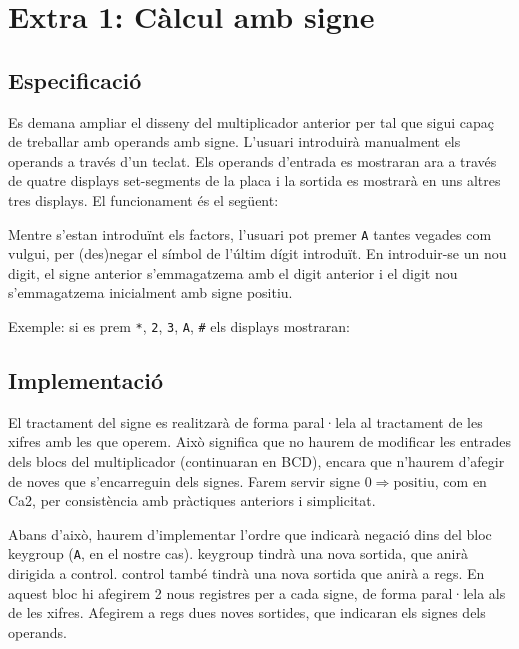 \chapter{Extra 1: Càlcul amb signe}

\section{Especificació}

Es demana ampliar el disseny del multiplicador anterior per tal que sigui capaç de treballar amb operands amb signe. L'usuari introduirà manualment els operands a través d'un teclat. Els operands d'entrada es mostraran ara a través de quatre displays set-segments de la placa i la sortida es mostrarà en uns altres tres displays. El funcionament és el següent:

Mentre s'estan introduïnt els factors, l'usuari pot premer \texttt{A} tantes vegades com vulgui, per (des)negar el símbol de l'últim dígit introduït. En introduir-se un nou digit, el signe anterior s'emmagatzema amb el digit anterior i el digit nou s'emmagatzema inicialment amb signe positiu.

Exemple: si es prem \texttt{*}, \texttt{2}, \texttt{3}, \texttt{A}, \texttt{\#} els displays mostraran:

\begin{center}
\sevenseg{-}\sevenseg{ } \sevenseg{ }\sevenseg{-}
\end{center}

\section{Implementació}

El tractament del signe es realitzarà de forma paral·lela al tractament de les xifres amb les que operem. Això significa que no haurem de modificar les entrades dels blocs del multiplicador (continuaran en BCD), encara que n'haurem d'afegir de noves que s'encarreguin dels signes. Farem servir signe $0 \Rightarrow \text{positiu}$, com en Ca2, per consistència amb pràctiques anteriors i simplicitat.

Abans d'això, haurem d'implementar l'ordre que indicarà negació dins del bloc keygroup (\texttt{A}, en el nostre cas). \textsf{keygroup} tindrà una nova sortida, que anirà dirigida a \textsf{control}. \textsf{control} també tindrà una nova sortida que anirà a \textsf{regs}. En aquest bloc hi afegirem 2 nous registres per a cada signe, de forma paral·lela als de les xifres. Afegirem a \textsf{regs} dues noves sortides, que indicaran els signes dels operands.

